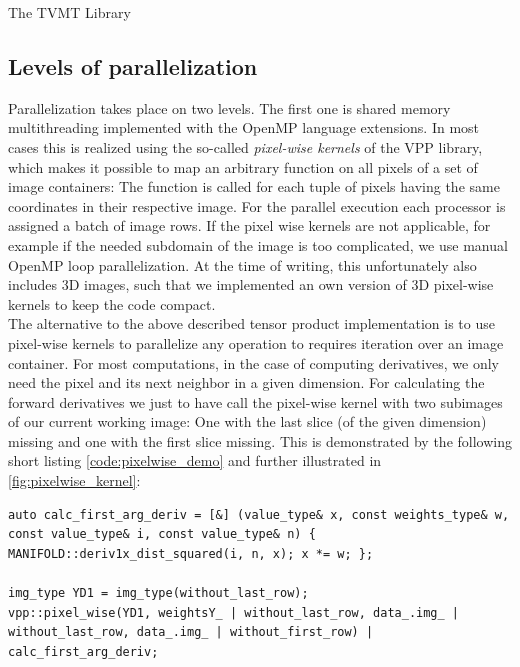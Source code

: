 \begin{chapter}{The TVMT Library}
\subsection{Levels of parallelization} %
\label{sub:Levels of parallelization}
Parallelization takes place on two levels. The first one is shared memory multithreading implemented with the OpenMP language extensions. In most cases this is realized 
using the so-called \textit{pixel-wise kernels} of the VPP library, which makes it possible to map an arbitrary function on all pixels of a set of image containers: The function is
called for each tuple of pixels having the same coordinates in their respective image. For the parallel execution each processor is assigned a batch of image rows.
If the pixel wise kernels are not applicable, for example if the needed subdomain of the image is too complicated, we use manual OpenMP loop parallelization. At the
time of writing, this unfortunately also includes 3D images, such that we implemented an own version of 3D pixel-wise kernels to keep the code compact.\\

The alternative to the above described tensor product implementation is to use pixel-wise kernels to parallelize any operation to requires iteration over an image container.
For most computations, in the case of computing derivatives, we only need the pixel and its next neighbor in a given dimension. For calculating the forward derivatives we just 
to have call the pixel-wise kernel with two subimages of our current working image: One with the last slice (of the given dimension) missing and one with the first slice missing.
This is demonstrated by the following short listing \ref{code:pixelwise_demo} and further illustrated in \ref{fig:pixelwise_kernel}:\\

\cppinline
\begin{lstlisting}[label=code:pixelwise_demo,caption={Pixel-wise forward derivative computation}]
auto calc_first_arg_deriv = [&] (value_type& x, const weights_type& w, const value_type& i, const value_type& n) { MANIFOLD::deriv1x_dist_squared(i, n, x); x *= w; }; 

img_type YD1 = img_type(without_last_row);
vpp::pixel_wise(YD1, weightsY_ | without_last_row, data_.img_ | without_last_row, data_.img_ | without_first_row) | calc_first_arg_deriv;
\end{lstlisting}


\end{chapter}
